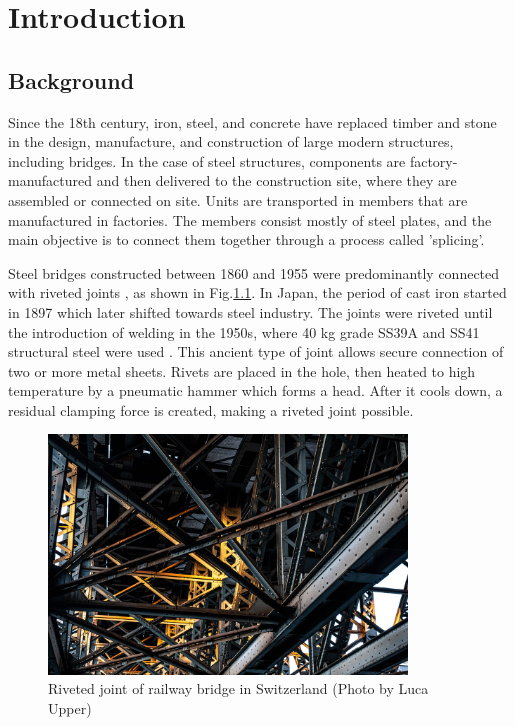 \chapter{Introduction}
\label{ch1}

\begin{spacing}{1.25} %
\minitoc %
\end{spacing} %
\onehalfspacing %

\section{Background}

Since the 18th century, iron, steel, and concrete have replaced timber and stone in the design, manufacture, and construction of large modern structures, including bridges. In the case of steel structures, components are factory-manufactured and then delivered to the construction site, where they are assembled or connected on site. Units are transported in members that are manufactured in factories. The members consist mostly of steel plates, and the main objective is to connect them together through a process called 'splicing'.

Steel bridges constructed between 1860 and 1955 were predominantly connected with riveted joints \cite{Quentin2012MorphogenesisStructures, COLLETTE2014, Ambroziak2023CASEANALYSIS, Collette2012Les18401940, Costa2013RehabilitationBridge}, as shown in Fig.\ref{fig-intro1}. In Japan, the period of cast iron started in 1897 which later shifted towards steel industry. The joints were riveted until the introduction of welding in the 1950s, where 40 kg grade SS39A and SS41 structural steel were used \cite{rivet1934}. This ancient type of joint allows secure connection of two or more metal sheets. Rivets are placed in the hole, then heated to high temperature by a pneumatic hammer which forms a head. After it cools down, a residual clamping force is created, making a riveted joint possible.

\begin{figure}[htbp]
    \centering
    \includegraphics[width=0.85\textwidth]{imgs/intro/steel-structure.jpg}
    \caption{Riveted joint of railway bridge in Switzerland (Photo by Luca Upper)}
    \label{fig-intro1}
\end{figure}

